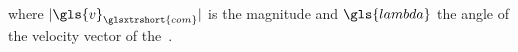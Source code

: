    where $\vert \gls{v}_{\glsxtrshort{com}} \vert$ is the magnitude and$~\gls{lambda}$ the angle of the velocity vector of the~. 
    


    

    
